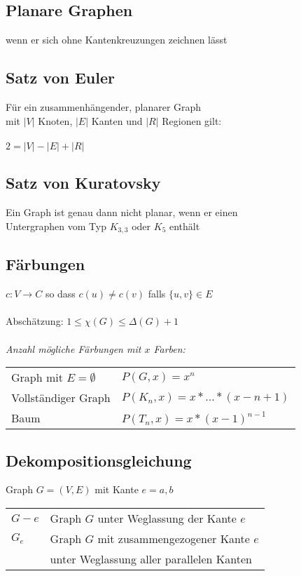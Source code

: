 \subsection{Planare Graphen}
wenn er sich ohne Kantenkreuzungen zeichnen lässt

\subsection{Satz von Euler}
Für ein zusammenhängender, planarer Graph \\ 
mit $|V|$ Knoten, $|E|$ Kanten und $|R|$ Regionen gilt: \\
\\
$2 = |V| - |E| + |R|$

\subsection{Satz von Kuratovsky}
Ein Graph ist genau dann nicht planar, wenn er einen \\ 
Untergraphen vom Typ $K_{3,3}$ oder $K_5$ enthält

\subsection{Färbungen}
$ c : V \rightarrow C $ so dass $c(u) \neq c(v) $ falls $\{u,v\} \in E $ \\
\\
Abschätzung: $ 1 \leq \chi(G) \leq \Delta (G) + 1 $ \\
\\
\textit{Anzahl mögliche Färbungen mit $x$ Farben:}\\
\begin{tabular}{@{}ll}
    Graph mit $E = \emptyset$ & $P(G,x)=x^n$ \\
    Vollständiger Graph & $P(K_n,x)=x * \dots * (x-n+1)$ \\
    Baum & $P(T_n,x)=x * (x-1)^{n-1}$ \\
\end{tabular}

\subsection{Dekompositionsgleichung}
Graph $G = (V,E)$ mit Kante $e={a,b}$ \\

\begin{tabular}{@{}ll}
    $G-e$ & Graph $G$ unter Weglassung der Kante $e$ \\
    $G_e$ & Graph $G$ mit zusammengezogener Kante $e$ \\
    & unter Weglassung aller parallelen Kanten
\end{tabular} \\

